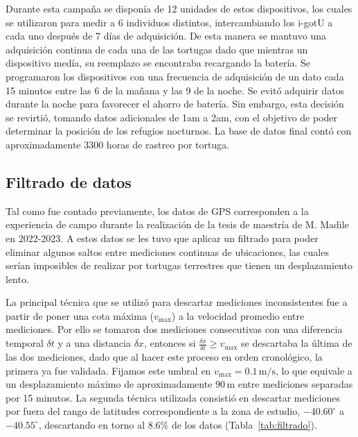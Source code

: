 Durante esta campaña se disponía de 12 unidades de estos dispositivos, los cuales se utilizaron para medir a 6 individuos distintos, intercambiando 
los i-gotU a cada uno después de 7 días de adquisición. De esta manera se mantuvo una adquisición continua de cada una de las tortugas dado que mientras 
un dispositivo medía, su reemplazo se encontraba recargando la batería. Se programaron los dispositivos con una frecuencia de adquisición de un dato cada
15 minutos entre las 6 de la mañana y las 9 de la noche. Se evitó adquirir datos durante la noche para favorecer el ahorro de batería. Sin embargo, esta 
decisión se revirtió, tomando datos adicionales de 1am a 2am, con el objetivo de poder determinar la posición de los refugios nocturnos. La base de datos
final contó con aproximadamente 3300 horas de rastreo por tortuga.

\subsection{Filtrado de datos}\label{I:filtrado}
Tal como fue contado previamente, los datos de GPS corresponden a la experiencia de campo durante la realización de la 
tesis de maestría de M. Madile~\cite{madile2023} en 2022-2023. A estos datos se les tuvo que aplicar un filtrado para poder eliminar algunos saltos entre 
mediciones continuas de ubicaciones, las cuales serían imposibles de realizar por tortugas terrestres que tienen un desplazamiento lento. 

La principal técnica que se utilizó para descartar mediciones inconsistentes fue a partir de poner una cota máxima ($v_{\max}$) a la velocidad promedio entre mediciones.
Por ello se tomaron dos mediciones consecutivas con una diferencia temporal $\delta t$ y a una distancia $\delta x$, entonces si $\frac{\delta x}{\delta t} \geq v_{\max}$ 
se descartaba la última de las dos mediciones, dado que al hacer este proceso en orden cronológico, la primera ya fue validada. Fijamos este umbral en 
$v_{\max}=0.1\,\mathrm{m/s}$, lo que equivale a un desplazamiento máximo de aproximadamente $90\,\mathrm{m}$ entre mediciones separadas por 15 minutos.
La segunda técnica utilizada consistió en descartar mediciones por fuera del rango de latitudes correspondiente a la zona de estudio, $-40.60^\circ$ a 
$-40.55^\circ$, descartando en torno al $ 8.6\% $ de los datos (Tabla~\ref{tab:filtrado}).


